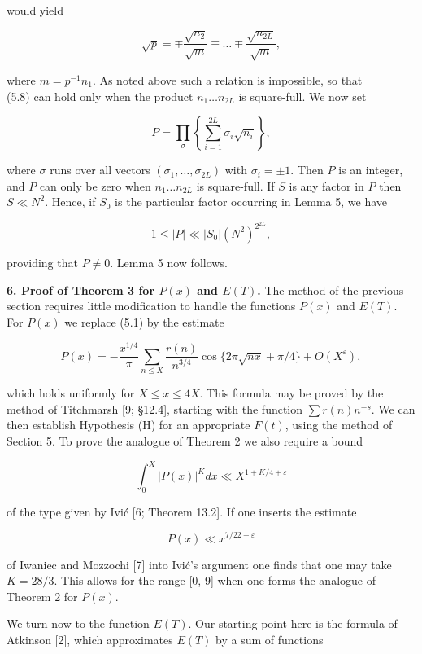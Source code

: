 \documentclass[10pt]{article}
\newcommand{\articleSection}[2]{%
  \par\medskip\noindent\textbf{#1. #2.}\enspace
}
\begin{document}
would yield

$$
\sqrt{p}=\mp \frac{\sqrt{n_{2}}}{\sqrt{m}} \mp \ldots \mp \frac{\sqrt{n_{2 L}}}{\sqrt{m}},
$$

where $m=p^{-1} n_{1}$. As noted above such a relation is impossible, so that\\
(5.8) can hold only when the product $n_{1} \ldots n_{2 L}$ is square-full. We now set

$$
P=\prod_{\sigma}\left\{\sum_{i=1}^{2 L} \sigma_{i} \sqrt{n_{i}}\right\},
$$

where $\sigma$ runs over all vectors $\left(\sigma_{1}, \ldots, \sigma_{2 L}\right)$ with $\sigma_{i}= \pm 1$. Then $P$ is an integer, and $P$ can only be zero when $n_{1} \ldots n_{2 L}$ is square-full. If $S$ is any factor in $P$ then $S \ll N^{2}$. Hence, if $S_{0}$ is the particular factor occurring in Lemma 5, we have

$$
1 \leq|P| \ll\left|S_{0}\right|\left(N^{2}\right)^{2^{2 L}},
$$

providing that $P \neq 0$. Lemma 5 now follows.

\articleSection{6}{Proof of Theorem 3 for $P(x)$ and $E(T)$}The method of the previous section requires little modification to handle the functions $P(x)$ and $E(T)$. For $P(x)$ we replace (5.1) by the estimate

$$
P(x)=-\frac{x^{1 / 4}}{\pi} \sum_{n \leq X} \frac{r(n)}{n^{3 / 4}} \cos \{2 \pi \sqrt{n x}+\pi / 4\}+O\left(X^{\varepsilon}\right),
$$

which holds uniformly for $X \leq x \leq 4 X$. This formula may be proved by the method of Titchmarsh [9; §12.4], starting with the function $\sum r(n) n^{-s}$. We can then establish Hypothesis (H) for an appropriate $F(t)$, using the method of Section 5. To prove the analogue of Theorem 2 we also require a bound

$$
\int_{0}^{X}|P(x)|^{K} d x \ll X^{1+K / 4+\varepsilon}
$$

of the type given by Ivić [6; Theorem 13.2]. If one inserts the estimate

$$
P(x) \ll x^{7 / 22+\varepsilon}
$$

of Iwaniec and Mozzochi [7] into Ivić's argument one finds that one may take $K=28 / 3$. This allows for the range [0, 9] when one forms the analogue of Theorem 2 for $P(x)$.

We turn now to the function $E(T)$. Our starting point here is the formula of Atkinson [2], which approximates $E(T)$ by a sum of functions
\end{document}

